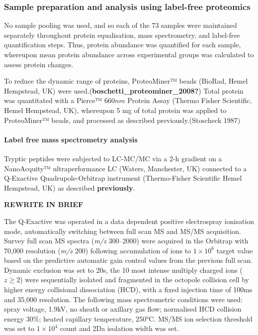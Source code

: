 \documentclass[9pt,lineno]{elife}
\begin{document}
\hypertarget{label-free-sample-prep}{%
\subsubsection{Sample preparation and analysis using label-free proteomics}\label{label-free-sample-prep}}

No sample pooling was used, and so each of the 73 samples were maintained separately throughout protein equalisation, mass spectrometry, and label-free quantification steps.
Thus, protein abundance was quantified for each sample, whereupon mean protein abundance across experimental groups was calculated to assess protein changes.

To reduce the dynamic range of proteins, ProteoMiner™ beads (BioRad, Hemel Hempstead, UK) were used.(\textbf{boschetti\_proteominer\_2008?})
Total protein was quantitated with a Pierce™ \(660 nm\) Protein Assay (Thermo Fisher Scientific, Hemel Hempstead, UK), whereupon 5 mg of total protein was applied to ProteoMiner™ beads, and processed as described previously.(Stoscheck 1987)

\hypertarget{label-free-mass-spectrometry-analysis}{%
\paragraph{Label free mass spectrometry analysis}\label{label-free-mass-spectrometry-analysis}}

Tryptic peptides were subjected to LC-MC/MC via a 2-h gradient on a NanoAcquity™ ultraperformance LC (Waters, Manchester, UK) connected to a Q-Exactive Quadrupole-Orbitrap instrument (Thermo-Fisher Scientific Hemel Hempstead, UK) as described \textbf{previously}.

\textbf{REWRITE IN BRIEF}

The Q-Exactive was operated in a data dependent positive electrospray ionisation mode, automatically switching between full scan MS and MS/MS acquisition.
Survey full scan MS spectra (\emph{m/z} 300--2000) were acquired in the Orbitrap with 70,000 resolution (\emph{m/z} 200) following accumulation of ions to \(1\times 10^6\) target value based on the predictive automatic gain control values from the previous full scan.
Dynamic exclusion was set to 20s, the 10 most intense multiply charged ions (\(z \geq 2\)) were sequentially isolated and fragmented in the octopole collision cell by higher energy collisional dissociation (HCD), with a fixed injection time of 100ms and 35,000 resolution.
The following mass spectrometric conditions were used: spray voltage, 1.9kV, no sheath or axillary gas flow; normalised HCD collision energy 30\%; heated capillary temperature, 250°C.
MS/MS ion selection threshold was set to \(1\times 10^4\) count and 2Da isolation width was set.
\end{document}
